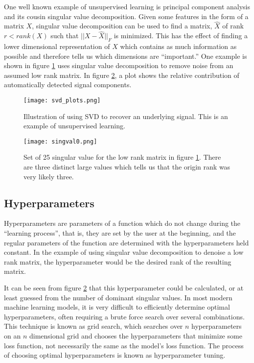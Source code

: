 One well known example of unsupervised learning is principal component analysis and its cousin singular value decomposition.  Given some features in the form of a matrix $X$, singular value decomposition can be used to find a matrix, $\hat{X}$ of rank $r < rank(X)$ such that $||X-\hat{X}||_F$ is minimized.  This has the effect of finding a lower dimensional representation of $X$ which contains as much information as possible and therefore tells us which dimensions are ``important.''  One example is shown in figure \ref{fig:svd_recover} uses singular value decomposition to remove noise from an assumed low rank matrix.  In figure \ref{fig:singval_good}, a plot shows the relative contribution of automatically detected signal components.  

\begin{figure}
    \centering
    \texttt{[image: svd\_plots.png]}
    \caption{Illustration of using SVD to recover an underlying signal.  This is an example of unsupervised learning.}
    \label{fig:svd_recover}
\end{figure}
\begin{figure}
    \centering
    \texttt{[image: singval0.png]}
    \caption{Set of 25 singular value for the low rank matrix in figure \ref{fig:svd_recover}.  There are three distinct large values which tells us that the origin rank was very likely three.}
    \label{fig:singval_good}
\end{figure}

\subsection{Hyperparameters} \label{sec:hyperparameters}
Hyperparameters are parameters of a function which do not change during the ``learning process'', that is, they are set by the user at the beginning, and the regular parameters of the function are determined with the hyperparameters held constant.  In the example of using singular value decomposition to denoise a low rank matrix, the hyperparameter would be the desired rank of the resulting matrix.  

It can be seen from figure \ref{fig:singval_good} that this hyperparameter could be calculated, or at least guessed from the number of dominant singular values.  In most modern machine learning models, it is very difficult to efficiently determine optimal hyperparameters, often requiring a brute force search over several combinations.  This technique is known as grid search, which searches over $n$ hyperparameters on an $n$ dimensional grid and chooses the hyperparameters that minimize some loss function, not necessarily the same as the model's loss function.  The process of choosing optimal hyperparameters is known as hyperparameter tuning.

